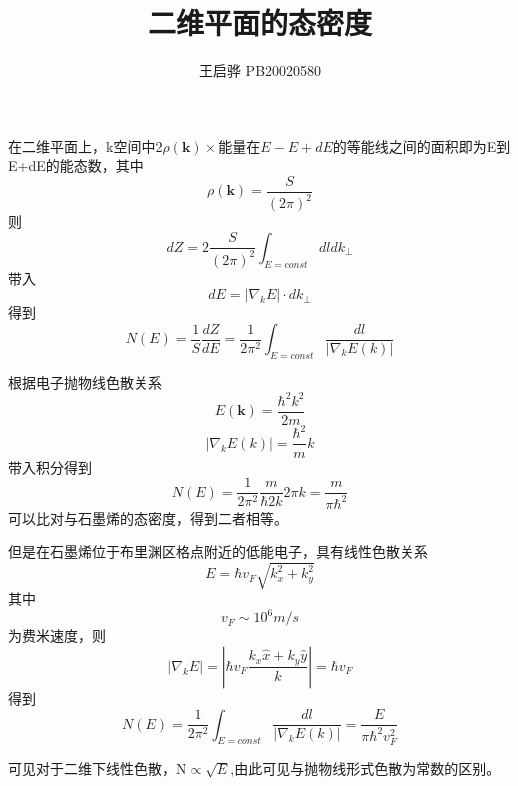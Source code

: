\documentclass{article}
\title{\songti \zihao{2}\bfseries 二维平面的态密度}
\author{王启骅 PB20020580}
\begin{document}
	\maketitle
在二维平面上，k空间中2$\rho(\boldsymbol{k})\times$能量在$ E-E+dE $的等能线之间的面积即为E到E+dE的能态数，其中
\begin{equation}
	\rho(\boldsymbol{k})=\frac{S}{(2\pi)^2}
\end{equation}
则
\begin{equation}
	dZ=2\frac{S}{(2\pi)^2}\int_{E=const}dldk_{\perp}
\end{equation}
带入
\begin{equation}
	dE=|\nabla_{k}E|\cdot dk_{\perp}
\end{equation}
得到
\begin{equation}
	N(E)=\frac{1}{S}\dfrac{dZ}{dE}=\frac{1}{2\pi^2}\int_{E=const}\frac{dl}{|\nabla_{k}E(k)|}
\end{equation}


根据电子抛物线色散关系
\begin{equation}
	E(\boldsymbol{k})=\frac{\hbar^2k^2}{2m}
\end{equation}
\begin{equation}
	|\nabla_{k}E(k)|=\frac{\hbar^2}{m}k
\end{equation}
带入积分得到
\begin{equation}
	N(E)=\frac{1}{2\pi^2}\frac{m}{\hbar2k}2\pi k=\frac{m}{\pi\hbar^2}
\end{equation}
可以比对与石墨烯的态密度，得到二者相等。


但是在石墨烯位于布里渊区格点附近的低能电子，具有线性色散关系
\begin{equation}
	E=\hbar v_F \sqrt{k_x^2+k_y^2}
\end{equation}
其中
\begin{equation}
	v_F\sim10^6m/s
\end{equation}
为费米速度，则
\begin{equation}
	|\nabla_{k}E|=|\hbar v_F \frac{k_x\hat{x}+k_y\hat{y}}{k}|=\hbar v_F
\end{equation}
得到
\begin{equation}
	N(E)=\frac{1}{2\pi^2}\int_{E=const}\frac{dl}{|\nabla_{k}E(k)|}=\frac{E}{\pi\hbar^2 v_F^2}
\end{equation}


可见对于二维下线性色散，N$\propto\sqrt{E}$,由此可见与抛物线形式色散为常数的区别。
\end{document}
